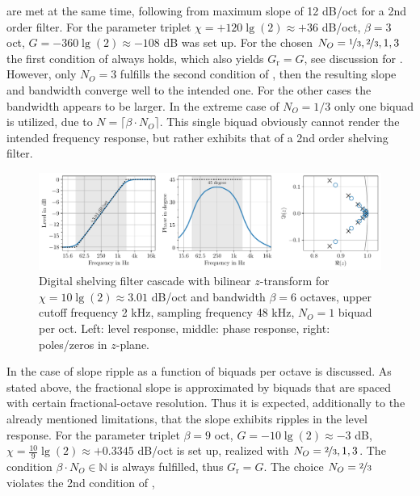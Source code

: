 are met at the same time, following from
maximum slope of 12 dB/oct for a 2nd order filter.
%
For  the parameter triplet
$\chi = +120 \lg(2) \approx +36$ dB/oct, $\beta = 3$ oct,
$G = -360 \lg(2) \approx -108$ dB was set up.
%
For the chosen $N_O = \nicefrac{1}{3}, \nicefrac{2}{3}, 1, 3$
the first condition of 
always holds, which also yields $G_\mathrm{r}=G$, see discussion for .
%
However, only $N_O=3$ fulfills the second condition of ,
then the resulting slope and bandwidth converge well to the intended one.
%
For the other cases the bandwidth appears to be larger.
%
In the extreme case of $N_O=1/3$ only one biquad is utilized, due to
$N = \lceil \beta \cdot N_{O} \rceil$.
%
This single biquad obviously cannot render the
intended frequency response, but rather exhibits that of a
2nd order shelving filter.
%

%
\begin{figure}[t]
\centering
\includegraphics[width=\textwidth]{../graphics/digital-3db-per-octave-shelving-filter.pdf}
\caption{
Digital shelving filter cascade with bilinear $z$-transform for
$\chi = 10\lg(2) \approx 3.01$ dB/oct and bandwidth $\beta=6$ octaves, upper
cutoff frequency 2 kHz, sampling frequency 48 kHz, $N_O=1$ biquad per oct.
%
Left: level response, middle: phase response, right: poles/zeros in
$z$-plane.
}
\label{fig:digital-3db-per-octave-shelving-filter}
\end{figure}
%
\NewL In  the case of slope ripple as a
function of biquads per octave is discussed.
%
As stated above, the fractional slope is approximated by biquads that are
spaced with certain fractional-octave resolution.
%
Thus it is expected, additionally to the already mentioned limitations,
that the slope exhibits ripples in the level response.
%
For  the parameter triplet
$\beta=9$ oct,
$G=-10\lg(2)\approx -3$ dB,
$\chi =  \frac{10}{9}\lg(2) \approx + 0.3345$ dB/oct
is set up, realized with
$N_O = \nicefrac{2}{3}, 1, 3$.
%
The condition $\beta \cdot N_O\in\mathbb{N}$ is always fulfilled, thus $G_\mathrm{r}=G$.
%
The choice $N_O=\nicefrac{2}{3}$ violates the 2nd condition of ,
